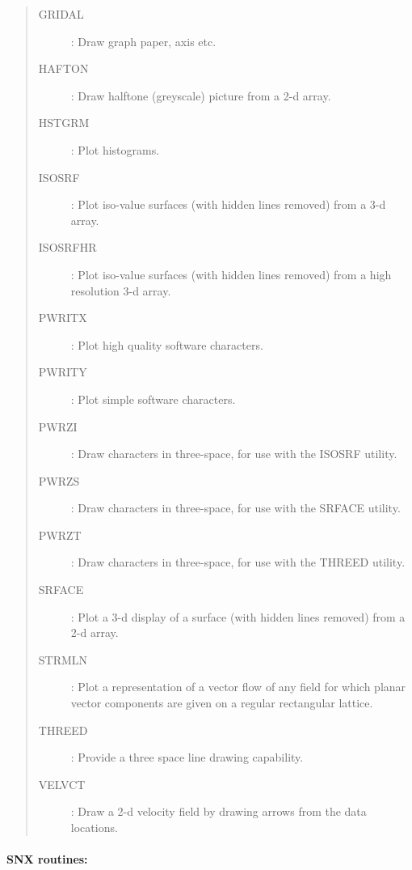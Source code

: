 \begin{quote}
\begin{description}
\item [GRIDAL] :
 Draw graph paper, axis etc.
\item [HAFTON] :
 Draw halftone (greyscale) picture from a 2-d array.
\item [HSTGRM] :
 Plot histograms.
\item [ISOSRF] :
 Plot iso-value surfaces (with hidden lines removed) from a 3-d array.
\item [ISOSRFHR] :
 Plot iso-value surfaces (with hidden lines removed) from a high resolution
 3-d array.
\item [PWRITX] :
 Plot high quality software characters.
\item [PWRITY] :
 Plot simple software characters.
\item [PWRZI] :
 Draw characters in three-space, for use with the ISOSRF utility.
\item [PWRZS] :
 Draw characters in three-space, for use with the SRFACE utility.
\item [PWRZT] :
 Draw characters in three-space, for use with the THREED utility.
\item [SRFACE] :
 Plot a 3-d display of a surface (with hidden lines removed) from a 2-d array.
\item [STRMLN] :
 Plot a representation of a vector flow of any field for which planar vector
 components are given on a regular rectangular lattice.
\item [THREED] :
 Provide a three space line drawing capability.
\item [VELVCT] :
 Draw a 2-d velocity field by drawing arrows from the data
 locations.
\end{description}
\end{quote}

\newpage

\paragraph{SNX routines:}

